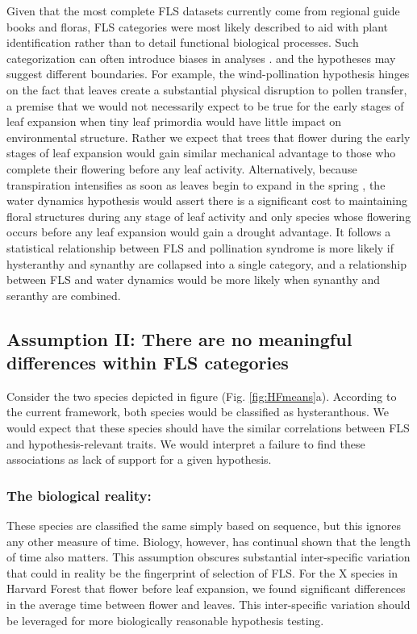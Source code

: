 \documentclass{article}
\begin{document}
Given that the most complete FLS datasets currently come from regional guide books and floras, FLS categories were most likely described to aid with plant identification rather than to detail functional biological processes. Such categorization can often introduce biases in analyses \citep{}. and the hypotheses may suggest different boundaries. For example, the wind-pollination hypothesis hinges on the fact that leaves create a substantial physical disruption to pollen transfer, a premise that we would not necessarily expect to be true for the early stages of leaf expansion when tiny leaf primordia would have little impact on environmental structure. Rather we expect that trees that flower during the early stages of leaf expansion would gain similar mechanical advantage to those who complete their flowering before any leaf activity. Alternatively, because transpiration intensifies as soon as leaves begin to expand in the spring \citep{Breda1996,Wang2018}, the water dynamics hypothesis would assert there is a significant cost to maintaining floral structures during any stage of leaf activity and only species whose flowering occurs before any leaf expansion would gain a drought advantage. It follows a statistical relationship between FLS and pollination syndrome is more likely if hysteranthy and synanthy are collapsed into a single category, and a relationship between FLS and water dynamics would be more likely when synanthy and seranthy are combined. 

\subsection*{Assumption II: There are no meaningful differences within FLS categories}
 Consider the two species depicted in figure (Fig. \ref{fig:HFmeans}a). According to the current framework, both species would be classified as hysteranthous. We would expect that these species should have the similar correlations between FLS and hypothesis-relevant traits. We would interpret a failure to find these associations as lack of support for a given hypothesis.
\subsubsection*{The biological reality:}
These species are classified the same simply based on sequence, but this ignores any other measure of time. Biology, however, has continual shown that the length of time also matters\citep{}. This assumption obscures substantial inter-specific variation that could in reality be the fingerprint of selection of FLS. For the X  species in Harvard Forest that flower before leaf expansion, we found significant differences in the average time between flower and leaves. This inter-specific variation should be leveraged for more biologically reasonable hypothesis testing.
\end{document}
